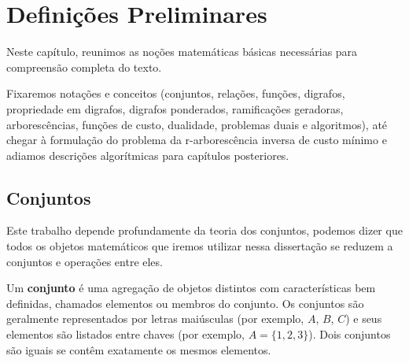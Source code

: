 \chapter{Definições Preliminares}

Neste capítulo, reunimos as noções matemáticas básicas necessárias para compreensão completa do texto.

Fixaremos notações e conceitos (conjuntos, relações, funções, digrafos, propriedade em digrafos, digrafos ponderados, ramificações geradoras, arborescências, funções de custo, dualidade, problemas duais e algoritmos), até chegar à formulação do problema da r-arborescência inversa de custo mínimo e adiamos descrições algorítmicas para capítulos posteriores.

\section{Conjuntos}

Este trabalho depende profundamente da teoria dos conjuntos, podemos dizer que todos os objetos matemáticos que iremos utilizar nessa dissertação se reduzem a conjuntos e operações entre eles.


Um \textbf{conjunto} é uma agregação de objetos distintos com características bem definidas, chamados elementos ou membros do conjunto. Os conjuntos são geralmente representados por letras maiúsculas (por exemplo, \(A\), \(B\), \(C\)) e seus elementos são listados entre chaves (por exemplo, \(A = \{1, 2, 3\}\)). Dois conjuntos são iguais se contêm exatamente os mesmos elementos.


